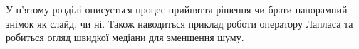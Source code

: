 У  п'ятому розділі описується процес прийняття рішення чи брати панорамний знімок як слайд, чи ні. 
Також наводиться приклад роботи оператору Лапласа та робиться огляд швидкої медіани для
зменшення шуму.